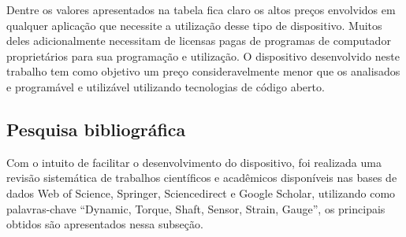 \begin{table}[!ht]
    \caption{Comparação entre dispositivos encontrados}
    \label{tab:Banchmarking}
    \centering
\end{table}

Dentre os valores apresentados na tabela fica claro os altos preços envolvidos em qualquer aplicação que necessite a utilização desse tipo de dispositivo.
Muitos deles adicionalmente necessitam de licensas pagas de programas de computador proprietários para sua programação e utilização.
O dispositivo desenvolvido neste trabalho tem como objetivo um preço consideravelmente menor que os analisados e programável e utilizável utilizando tecnologias
de código aberto.

\subsection{Pesquisa bibliográfica}

Com o intuito de facilitar o desenvolvimento do dispositivo, foi realizada uma revisão sistemática de trabalhos científicos e acadêmicos disponíveis nas bases de dados Web of Science, Springer,
Sciencedirect e Google Scholar, utilizando como palavras-chave “Dynamic, Torque, Shaft, Sensor, Strain, Gauge”, os principais obtidos são apresentados nessa subseção.

